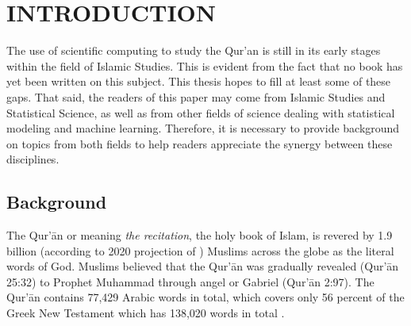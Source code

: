 \chapter{INTRODUCTION}
\label{ch:introduction}
The use of scientific computing to study the Qur'an is still in its early stages within the field of Islamic Studies. This is evident from the fact that no book has yet been written on this subject. This thesis hopes to fill at least some of these gaps. That said, the readers of this paper may come from Islamic Studies and Statistical Science, as well as from other fields of science dealing with statistical modeling and machine learning. Therefore, it is necessary to provide background on topics from both fields to help readers appreciate the synergy between these disciplines.

\section{Background}
The Qur'\=an or   meaning \textit{the recitation}, the holy book of Islam, is revered by 1.9 billion (according to 2020 projection of ) Muslims across the globe as the literal words of God. Muslims believed that the Qur'\=an was gradually revealed (Qur'\=an 25:32) to Prophet Muhammad  through angel   or Gabriel (Qur'\=an 2:97). The Qur'\=an contains 77,429 Arabic words in total, which covers only 56 percent of the Greek New Testament which has 138,020 words in total \cite[p.~11]{sinai2017}. 

